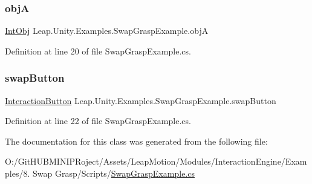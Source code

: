 \subsubsection{\texorpdfstring{objA}{objA}}
{\footnotesize\ttfamily \mbox{\hyperlink{namespace_leap_1_1_unity_1_1_examples_a009a8c553109ae98a972c43c460d0041}{Int\+Obj}} Leap.\+Unity.\+Examples.\+Swap\+Grasp\+Example.\+objA}



Definition at line 20 of file Swap\+Grasp\+Example.\+cs.

\mbox{\label{class_leap_1_1_unity_1_1_examples_1_1_swap_grasp_example_a1aca750068585029a35a8cca2adfa7aa}} 
\subsubsection{\texorpdfstring{swapButton}{swapButton}}
{\footnotesize\ttfamily \mbox{\hyperlink{class_leap_1_1_unity_1_1_interaction_1_1_interaction_button}{Interaction\+Button}} Leap.\+Unity.\+Examples.\+Swap\+Grasp\+Example.\+swap\+Button}



Definition at line 22 of file Swap\+Grasp\+Example.\+cs.



The documentation for this class was generated from the following file\+:\begin{DoxyCompactItemize}
\item 
O\+:/\+Git\+H\+U\+B\+M\+I\+N\+I\+P\+Roject/\+Assets/\+Leap\+Motion/\+Modules/\+Interaction\+Engine/\+Examples/8. Swap Grasp/\+Scripts/\mbox{\hyperlink{_swap_grasp_example_8cs}{Swap\+Grasp\+Example.\+cs}}\end{DoxyCompactItemize}
